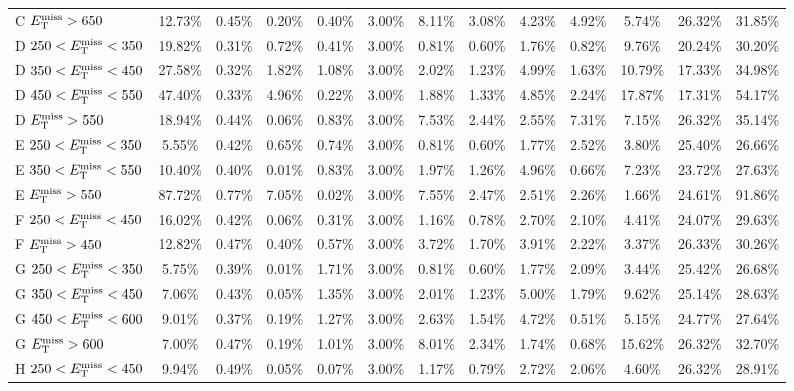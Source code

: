 \begin{table}
\begin{tabular}{|l|ccccccccccc|c|}
 C $E_\text{T}^\text{miss}>650$     & 12.73\% & 0.45\%  & 0.20\%  & 0.40\%  & 3.00\%  & 8.11\%  & 3.08\%  & 4.23\%  & 4.92\%  & 5.74\%  & 26.32\% & 31.85\% \\
 D $250<E_\text{T}^\text{miss}<350$ & 19.82\% & 0.31\%  & 0.72\%  & 0.41\%  & 3.00\%  & 0.81\%  & 0.60\%  & 1.76\%  & 0.82\%  & 9.76\%  & 20.24\% & 30.20\% \\
 D $350<E_\text{T}^\text{miss}<450$ & 27.58\% & 0.32\%  & 1.82\%  & 1.08\%  & 3.00\%  & 2.02\%  & 1.23\%  & 4.99\%  & 1.63\%  & 10.79\% & 17.33\% & 34.98\% \\
 D $450<E_\text{T}^\text{miss}<550$ & 47.40\% & 0.33\%  & 4.96\%  & 0.22\%  & 3.00\%  & 1.88\%  & 1.33\%  & 4.85\%  & 2.24\%  & 17.87\% & 17.31\% & 54.17\% \\
 D $E_\text{T}^\text{miss}>550$     & 18.94\% & 0.44\%  & 0.06\%  & 0.83\%  & 3.00\%  & 7.53\%  & 2.44\%  & 2.55\%  & 7.31\%  & 7.15\%  & 26.32\% & 35.14\% \\
 E $250<E_\text{T}^\text{miss}<350$ & 5.55\%  & 0.42\%  & 0.65\%  & 0.74\%  & 3.00\%  & 0.81\%  & 0.60\%  & 1.77\%  & 2.52\%  & 3.80\%  & 25.40\% & 26.66\% \\
 E $350<E_\text{T}^\text{miss}<550$ & 10.40\% & 0.40\%  & 0.01\%  & 0.83\%  & 3.00\%  & 1.97\%  & 1.26\%  & 4.96\%  & 0.66\%  & 7.23\%  & 23.72\% & 27.63\% \\
 E $E_\text{T}^\text{miss}>550$     & 87.72\% & 0.77\%  & 7.05\%  & 0.02\%  & 3.00\%  & 7.55\%  & 2.47\%  & 2.51\%  & 2.26\%  & 1.66\%  & 24.61\% & 91.86\% \\
 F $250<E_\text{T}^\text{miss}<450$ & 16.02\% & 0.42\%  & 0.06\%  & 0.31\%  & 3.00\%  & 1.16\%  & 0.78\%  & 2.70\%  & 2.10\%  & 4.41\%  & 24.07\% & 29.63\% \\
 F $E_\text{T}^\text{miss}>450$     & 12.82\% & 0.47\%  & 0.40\%  & 0.57\%  & 3.00\%  & 3.72\%  & 1.70\%  & 3.91\%  & 2.22\%  & 3.37\%  & 26.33\% & 30.26\% \\
 G $250<E_\text{T}^\text{miss}<350$ & 5.75\%  & 0.39\%  & 0.01\%  & 1.71\%  & 3.00\%  & 0.81\%  & 0.60\%  & 1.77\%  & 2.09\%  & 3.44\%  & 25.42\% & 26.68\% \\
 G $350<E_\text{T}^\text{miss}<450$ & 7.06\%  & 0.43\%  & 0.05\%  & 1.35\%  & 3.00\%  & 2.01\%  & 1.23\%  & 5.00\%  & 1.79\%  & 9.62\%  & 25.14\% & 28.63\% \\
 G $450<E_\text{T}^\text{miss}<600$ & 9.01\%  & 0.37\%  & 0.19\%  & 1.27\%  & 3.00\%  & 2.63\%  & 1.54\%  & 4.72\%  & 0.51\%  & 5.15\%  & 24.77\% & 27.64\% \\
 G $E_\text{T}^\text{miss}>600$     & 7.00\%  & 0.47\%  & 0.19\%  & 1.01\%  & 3.00\%  & 8.01\%  & 2.34\%  & 1.74\%  & 0.68\%  & 15.62\% & 26.32\% & 32.70\% \\
 H $250<E_\text{T}^\text{miss}<450$ & 9.94\%  & 0.49\%  & 0.05\%  & 0.07\%  & 3.00\%  & 1.17\%  & 0.79\%  & 2.72\%  & 2.06\%  & 4.60\%  & 26.32\% & 28.91\% \\

\end{tabular}
\end{table}
